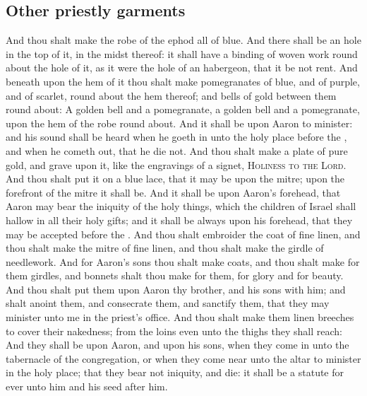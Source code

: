 \begin{biblechapter}
\section*{Other priestly garments}
\verse And thou shalt make the robe of the ephod all of blue.
\verse And there shall be an hole in the top of it, in the midst thereof: it shall have a binding of woven work round about the hole of it, as it were the hole of an habergeon, that it be not rent.
\verse And beneath upon the hem of it thou shalt make pomegranates of blue, and of purple, and of scarlet, round about the hem thereof; and bells of gold between them round about:
\verse A golden bell and a pomegranate, a golden bell and a pomegranate, upon the hem of the robe round about.
\verse And it shall be upon Aaron to minister: and his sound shall be heard when he goeth in unto the holy place before the \LORD, and when he cometh out, that he die not.
\verse And thou shalt make a plate of pure gold, and grave upon it, like the engravings of a signet, \textsc{Holiness to the Lord}.
\verse And thou shalt put it on a blue lace, that it may be upon the mitre; upon the forefront of the mitre it shall be.
\verse And it shall be upon Aaron's forehead, that Aaron may bear the iniquity of the holy things, which the children of Israel shall hallow in all their holy gifts; and it shall be always upon his forehead, that they may be accepted before the \LORD.
\verse And thou shalt embroider the coat of fine linen, and thou shalt make the mitre of fine linen, and thou shalt make the girdle of needlework.
\verse And for Aaron's sons thou shalt make coats, and thou shalt make for them girdles, and bonnets shalt thou make for them, for glory and for beauty.
\verse And thou shalt put them upon Aaron thy brother, and his sons with him; and shalt anoint them, and consecrate them, and sanctify them, that they may minister unto me in the priest's office.
\verse And thou shalt make them linen breeches to cover their nakedness; from the loins even unto the thighs they shall reach:
\verse And they shall be upon Aaron, and upon his sons, when they come in unto the tabernacle of the congregation, or when they come near unto the altar to minister in the holy place; that they bear not iniquity, and die: it shall be a statute for ever unto him and his seed after him.
\end{biblechapter}

